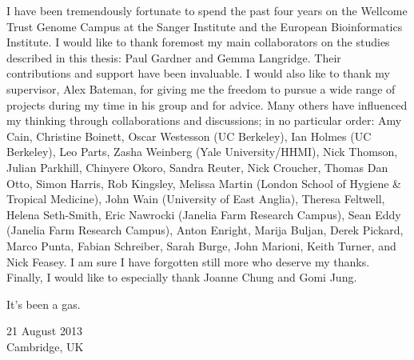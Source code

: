 

\begin{acknowledgementslong} 

I have been tremendously fortunate to spend the past four years on the Wellcome Trust Genome Campus at the Sanger Institute and the European Bioinformatics Institute. I would like to thank foremost my main collaborators on the studies described in this thesis: Paul Gardner and Gemma Langridge. Their contributions and support have been invaluable. I would also like to thank my supervisor, Alex Bateman, for giving me the freedom to pursue a wide range of projects during my time in his group and for advice. Many others have influenced my thinking through collaborations and discussions; in no particular order: Amy Cain, Christine Boinett, Oscar Westesson (UC Berkeley), Ian Holmes (UC Berkeley), Leo Parts, Zasha Weinberg (Yale University/HHMI), Nick Thomson, Julian Parkhill, Chinyere Okoro, Sandra Reuter, Nick Croucher, Thomas Dan Otto, Simon Harris, Rob Kingsley, Melissa Martin (London School of Hygiene \& Tropical Medicine), John Wain (University of East Anglia), Theresa Feltwell, Helena Seth-Smith, Eric Nawrocki (Janelia Farm Research Campus), Sean Eddy (Janelia Farm Research Campus), Anton Enright, Marija Buljan, Derek Pickard, Marco Punta, Fabian Schreiber, Sarah Burge, John Marioni, Keith Turner, and Nick Feasey. I am sure I have forgotten still more who deserve my thanks. Finally, I would like to especially thank Joanne Chung and Gomi Jung. 

\vspace{\baselineskip}
\noindent
It's been a gas.

\vspace{\baselineskip}
\noindent
\begin{flushright}
21 August 2013\\
Cambridge, UK
\end{flushright}

\end{acknowledgementslong}


